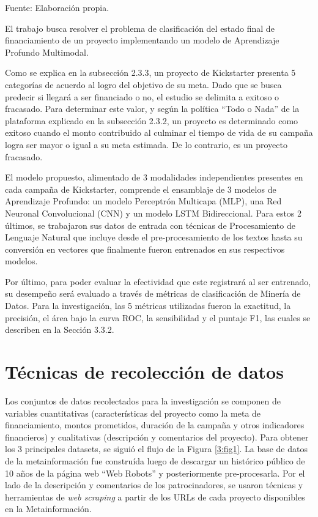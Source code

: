 \begin{flushleft}	%
	\small Fuente: Elaboración propia.
\end{flushleft}

El trabajo busca resolver el problema de clasificación del estado final de financiamiento de un proyecto implementando un modelo de Aprendizaje Profundo Multimodal.

Como se explica en la subsección 2.3.3, un proyecto de Kickstarter presenta 5 categorías de acuerdo al logro del objetivo de su meta. Dado que se busca predecir si llegará a ser financiado o no, el estudio se delimita a exitoso o fracasado. Para determinar este valor, y según la política “Todo o Nada” de la plataforma explicado en la subsección 2.3.2, un proyecto es determinado como exitoso cuando el monto contribuido al culminar el tiempo de vida de su campaña logra ser mayor o igual a su meta estimada. De lo contrario, es un proyecto fracasado.

El modelo propuesto, alimentado de 3 modalidades independientes presentes en cada campaña de Kickstarter, comprende el ensamblaje de 3 modelos de Aprendizaje Profundo: un modelo Perceptrón Multicapa (MLP), una Red Neuronal Convolucional (CNN) y un modelo LSTM Bidireccional. Para estos 2 últimos, se trabajaron sus datos de entrada con técnicas de Procesamiento de Lenguaje Natural que incluye desde el pre-procesamiento de los textos hasta su conversión en vectores que finalmente fueron entrenados en sus respectivos modelos.

Por último, para poder evaluar la efectividad que este registrará al ser entrenado, su desempeño será evaluado a través de métricas de clasificación de Minería de Datos. Para la investigación, las 5 métricas utilizadas fueron la exactitud, la precisión, el área bajo la curva ROC, la sensibilidad y el puntaje F1, las cuales se describen en la Sección 3.3.2.

\section{Técnicas de recolección de datos}
Los conjuntos de datos recolectados para la investigación se componen de variables cuantitativas (características del proyecto como la meta de financiamiento, montos prometidos, duración de la campaña y otros indicadores financieros) y cualitativas (descripción y comentarios del proyecto). Para obtener los 3 principales datasets, se siguió el flujo de la Figura \ref{3:fig1}. La base de datos de la metainformación fue construída luego de descargar un histórico público de 10 años de la página web “Web Robots” y posteriormente pre-procesarla. Por el lado de la descripción y comentarios de los patrocinadores, se usaron técnicas y herramientas de \textit{web scraping} a partir de los URLs de cada proyecto disponibles en la Metainformación.

